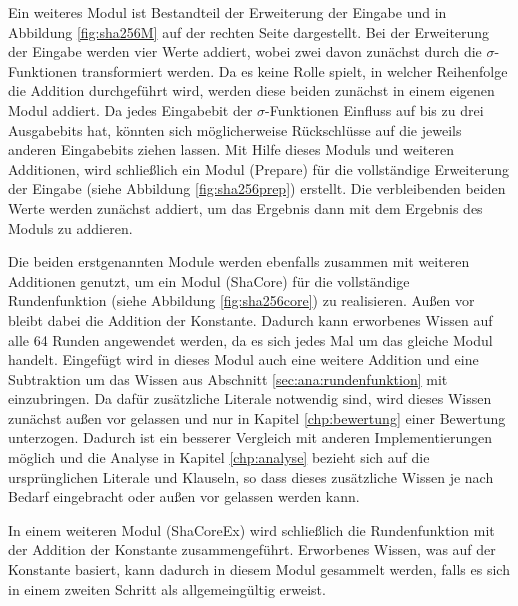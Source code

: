 Ein weiteres Modul ist Bestandteil der Erweiterung der Eingabe und in Abbildung \ref{fig:sha256M} auf der rechten Seite
dargestellt. Bei der Erweiterung der Eingabe werden vier Werte addiert, wobei zwei davon zunächst durch die $ \sigma $-Funktionen
transformiert werden. Da es keine Rolle spielt, in welcher Reihenfolge die Addition durchgeführt wird, werden diese
beiden zunächst in einem eigenen Modul addiert. Da jedes Eingabebit der $ \sigma $-Funktionen Einfluss auf bis zu
drei Ausgabebits hat, könnten sich möglicherweise Rückschlüsse auf die jeweils anderen Eingabebits ziehen lassen.
Mit Hilfe dieses Moduls und weiteren Additionen, wird schließlich ein Modul (Prepare) für die vollständige Erweiterung der Eingabe
(siehe Abbildung \ref{fig:sha256prep}) erstellt. Die verbleibenden beiden Werte werden zunächst addiert, um das Ergebnis
dann mit dem Ergebnis des Moduls zu addieren.

Die beiden erstgenannten Module werden ebenfalls zusammen mit weiteren Additionen genutzt, um ein Modul (ShaCore) für die vollständige
Rundenfunktion (siehe Abbildung \ref{fig:sha256core}) zu realisieren. Außen vor bleibt dabei die Addition der Konstante.
Dadurch kann erworbenes Wissen auf alle 64 Runden angewendet werden, da es sich jedes Mal um das gleiche Modul handelt.
Eingefügt wird in dieses Modul auch eine weitere Addition und eine Subtraktion um das Wissen aus Abschnitt \ref{sec:ana:rundenfunktion}
mit einzubringen. Da dafür zusätzliche Literale notwendig sind, wird dieses Wissen zunächst außen vor gelassen und nur in Kapitel
\ref{chp:bewertung} einer Bewertung unterzogen. Dadurch ist ein besserer Vergleich mit anderen Implementierungen möglich und
die Analyse in Kapitel \ref{chp:analyse} bezieht sich auf die ursprünglichen Literale und Klauseln, so dass dieses zusätzliche
Wissen je nach Bedarf eingebracht oder außen vor gelassen werden kann.

In einem weiteren Modul (ShaCoreEx) wird schließlich die Rundenfunktion mit der Addition der Konstante zusammengeführt.
Erworbenes Wissen, was auf der Konstante basiert, kann dadurch in diesem Modul gesammelt werden, falls es sich in einem
zweiten Schritt als allgemeingültig erweist.

